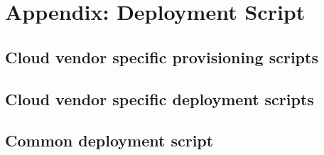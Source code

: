  
\chapter[Appendix: Deployment Script]{Appendix: Deployment Script}




\section{Cloud vendor specific provisioning scripts}










\section{Cloud vendor specific deployment scripts}














\section{Common deployment script}

